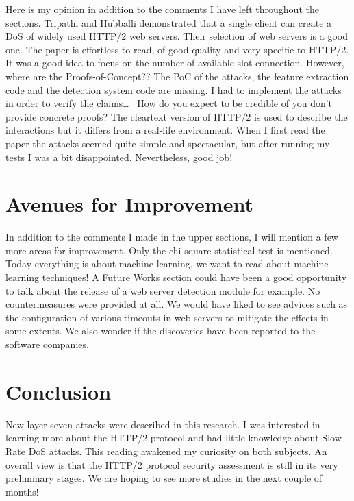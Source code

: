 \documentclass[11pt, a4paper]{article}
\begin{document}
Here is my opinion in addition to the comments I have left throughout the sections.
Tripathi and Hubballi demonstrated that a single client can create a DoS of widely used HTTP/2 web servers.
Their selection of web servers is a good one.
The paper is effortless to read, of good quality and very specific to HTTP/2.
It was a good idea to focus on the number of available slot connection.
However, where are the Proofs-of-Concept??
The PoC of the attacks, the feature extraction code and the detection system code are missing.
I had to implement the attacks in order to verify the claims\ldots~
How do you expect to be credible of you don't provide concrete proofs?
The cleartext version of HTTP/2 is used to describe the interactions but it differs from a real-life environment.
When I first read the paper the attacks seemed quite simple and spectacular, but after running my tests I was a bit disappointed.
Nevertheless, good job!

\section{Avenues for Improvement}

In addition to the comments I made in the upper sections, I will mention a few more areas for improvement.
Only the chi-square statistical test is mentioned.
Today everything is about machine learning, we want to read about machine learning techniques!
A Future Works section could have been a good opportunity to talk about the release of a web server detection module for example.
No countermeasures were provided at all.
We would have liked to see advices such as the configuration of various timeouts in web servers to mitigate the effects in some extents.
We also wonder if the discoveries have been reported to the software companies.

\section{Conclusion}

New layer seven attacks were described in this research.
I was interested in learning more about the HTTP/2 protocol and had little knowledge about Slow Rate DoS attacks.
This reading awakened my curiosity on both subjects.
An overall view is that the HTTP/2 protocol security assessment is still in its very preliminary stages.
We are hoping to see more studies in the next couple of months!




\end{document}
